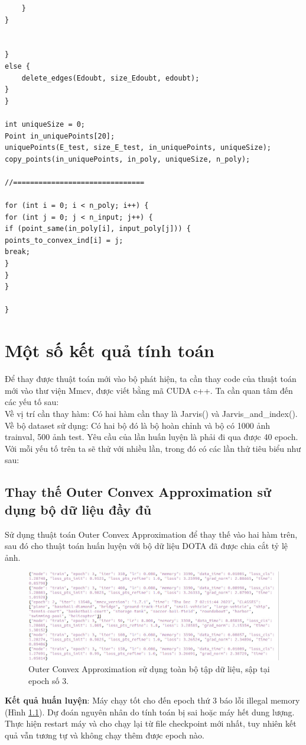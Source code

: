 \documentclass[12pt,a4paper,openany,oneside]{report}
\begin{document}
\begin{lstlisting}
	}
}


}
else {
	delete_edges(Edoubt, size_Edoubt, edoubt);
}
}

int uniqueSize = 0;
Point in_uniquePoints[20];
uniquePoints(E_test, size_E_test, in_uniquePoints, uniqueSize);
copy_points(in_uniquePoints, in_poly, uniqueSize, n_poly);

//===============================

for (int i = 0; i < n_poly; i++) {
for (int j = 0; j < n_input; j++) {
if (point_same(in_poly[i], input_poly[j])) {
points_to_convex_ind[i] = j;
break;
}
}
}                                          

}
\end{lstlisting}	
\chapter{Một số kết quả tính toán }

Để thay được thuật toán mới vào bộ phát hiện, ta cần thay code của thuật toán mới vào thư viện Mmcv, được viết bằng mã CUDA c++. Ta cần quan tâm đến các yếu tố sau:\\
Về vị trí cần thay hàm: Có hai hàm cần thay là Jarvis() và Jarvis\_and\_index().\\
Về bộ dataset sử dụng: Có hai bộ đó là bộ hoàn chỉnh và bộ có 1000 ảnh trainval, 500 ảnh test. Yêu cầu của lần huấn luyện là phải đi qua được 40 epoch.\\
Với mỗi yếu tố trên ta sẽ thử với nhiều lần, trong đó có các lần thử tiêu biểu như sau:
\section{Thay thế Outer Convex Approximation sử dụng bộ dữ liệu đầy đủ}
Sử dụng thuật toán Outer Convex Approximation để thay thế vào hai hàm trên, sau đó cho thuật toán huấn luyện với bộ dữ liệu DOTA đã được chia cắt tỷ lệ ảnh.\\

\begin{figure}[ht!]
	\begin{center}
		\includegraphics[width=450px]{./outer_fulldata_epoch3.JPG}
		\caption{Outer Convex Approximation sử dụng toàn bộ tập dữ liệu, sập tại epoch số 3.}
		\label{outer_fulldata_epoch3}
	\end{center}
\end{figure} 
\textbf{Kết quả huấn luyện}: Máy chạy tốt cho đến epoch thứ 3 báo lỗi illegal memory (Hình \ref{outer_fulldata_epoch3}). Dự đoán nguyên nhân do tính toán bị sai hoặc máy hết dung lượng. Thực hiện restart máy và cho chạy lại từ file checkpoint mới nhất, tuy nhiên kết quả vẫn tương tự và không chạy thêm được epoch nào.
\end{document}
